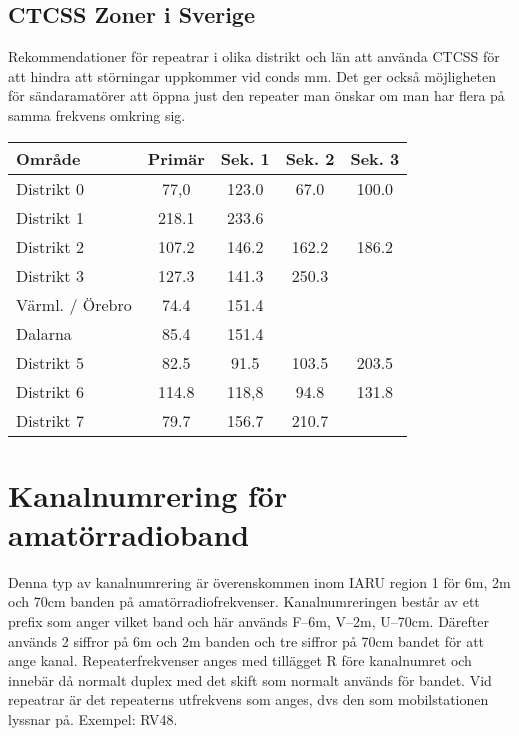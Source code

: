 \subsection{CTCSS Zoner i Sverige}

Rekommendationer för repeatrar i olika distrikt och län att använda CTCSS för att hindra att störningar uppkommer vid conds mm. Det ger också möjligheten för sändaramatörer att öppna just den repeater man önskar om man har flera på samma frekvens omkring sig.

\begin{longtable}{lcccc}
	\textbf{Område} & \textbf{Primär} & \textbf{Sek. 1} & \textbf{Sek. 2} & \textbf{Sek. 3} \\ \hline
	\endhead
	Distrikt 0      &      77,0       &      123.0      &      67.0       &      100.0      \\
	Distrikt 1      &      218.1      &      233.6      &                 &  \\
	Distrikt 2      &      107.2      &      146.2      &      162.2      &      186.2      \\
	Distrikt 3      &      127.3      &      141.3      &      250.3      &  \\
	Värml. / Örebro &      74.4       &      151.4      &                 &  \\
	Dalarna         &      85.4       &      151.4      &                 &  \\
	Distrikt 5      &      82.5       &      91.5       &      103.5      &      203.5      \\
	Distrikt 6      &      114.8      &      118,8      &      94.8       &      131.8      \\
	Distrikt 7      &      79.7       &      156.7      &      210.7      &
\end{longtable}

\section{Kanalnumrering för amatörradioband}

Denna typ av kanalnumrering är överenskommen inom IARU region 1 för 6m, 2m och 70cm banden på amatörradiofrekvenser. Kanalnumreringen består av ett prefix som anger vilket band och här används F--6m, V--2m, U--70cm. Därefter används 2 siffror på 6m och 2m banden och tre siffror på 70cm bandet för att ange kanal. Repeaterfrekvenser anges med tillägget R före kanalnumret och innebär då normalt duplex med det skift som normalt används för bandet. Vid repeatrar är det repeaterns utfrekvens som anges, dvs den som mobilstationen lyssnar på. Exempel: RV48.

